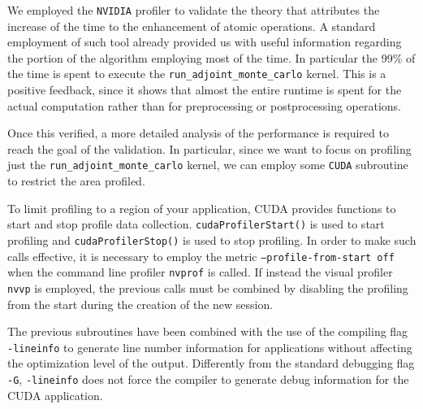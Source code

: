 \documentclass[a4paper,10pt]{article}
\begin{document}
We employed the \texttt{NVIDIA} profiler to validate the theory that attributes 
the increase of the time to the enhancement of atomic operations.
A standard employment of such tool already provided us with useful information 
regarding the portion of the algorithm employing most of the time. In 
particular the 99\% of the time is spent to execute the 
\texttt{run\_adjoint\_monte\_carlo} kernel. This is a positive feedback, since 
it shows that almost the entire runtime is spent for the actual 
computation rather than for preprocessing or postprocessing operations.

Once this verified, a more detailed analysis of the performance is required to 
reach the goal of the validation. In particular, since we want to focus on 
profiling just the \texttt{run\_adjoint\_monte\_carlo} kernel, we can employ 
some \texttt{CUDA} subroutine to restrict the area profiled. 

To limit profiling to a region of your application, CUDA provides functions to 
start and stop profile data collection. \texttt{cudaProfilerStart()} is used to 
start profiling and \texttt{cudaProfilerStop()} is used to stop profiling. In 
order to make such calls effective, it is necessary to employ the metric 
\texttt{--profile-from-start off} when the command line profiler 
\texttt{nvprof} is called. If instead the visual profiler \texttt{nvvp} is 
employed, the previous calls must be combined by disabling the profiling from 
the start during the creation of the new session. \newline

The previous subroutines have been combined with the use of the compiling flag 
\texttt{-lineinfo} to generate line number information for applications 
without affecting the optimization level of the output. Differently from the 
standard debugging flag \texttt{-G}, \texttt{-lineinfo} does not force the 
compiler to generate debug information for the CUDA application. 
\end{document}
